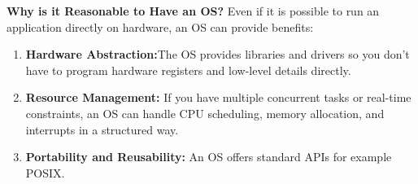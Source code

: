 \documentclass{article}
\newcommand{\bo}[1]{\textbf{#1}}
\begin{document}
\bo{Why is it Reasonable to Have an OS?}
Even if it is possible to run an application directly on hardware, an OS can provide benefits:

\begin{enumerate}
  \item \bo{Hardware Abstraction:}The OS provides libraries and drivers so you don’t have to program hardware registers and low-level details directly.
  \item \bo{Resource Management:} If you have multiple concurrent tasks or real-time constraints, an OS can handle CPU scheduling, memory allocation, and interrupts in a structured way.
  \item \bo{Portability and Reusability:} An OS offers standard APIs for example POSIX.
\end{enumerate}
\end{document}
